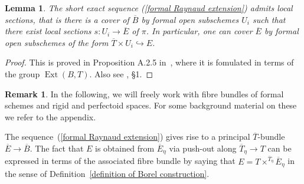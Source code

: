 \documentclass[10pt,oneside]{amsart}
\newtheorem{lemma}[theorem]{Lemma}
\theoremstyle{definition}
\newtheorem{remark}[theorem]{Remark}
\begin{document}
	\begin{lemma}\label{formal Raynaud sequence is locally split}
		The short exact sequence (\ref{formal Raynaud extension}) admits local sections, that is there is a cover of $\overline{B}$ by formal open subschemes $U_i$ such that there exist local sections $s:U_i\rightarrow \overline{E}$ of $\pi$. In particular, one can cover $\overline{E}$ by formal open subschemes of the form $\overline{T}\times U_i\hookrightarrow E$.
	\end{lemma}
	\begin{proof}
		This is proved in Proposition A.2.5 in~\cite{Lut}, where it is fomulated in terms of the group $\operatorname{Ext}(B,T)$. Also see \cite{BL}, \S 1.
	\end{proof}
	
	\begin{remark}
	In the following, we will freely work with fibre bundles of formal schemes and rigid and perfectoid spaces. For some background material on these we refer to the appendix.
	\end{remark}
	
	The sequence~(\ref{formal Raynaud extension}) gives rise to a principal $\overline{T}$-bundle
	$\overline{E}\rightarrow \overline{B}$. The fact that $E$ is obtained from $\overline{E}_\eta$ via push-out along $\overline{T}_\eta\rightarrow T$ can be expressed in terms of the associated fibre bundle by saying that $E = T\times^{\overline{T}_\eta}\overline{E}_\eta$ in the sense of Definition~\ref{definition of Borel construction}.
	
\end{document}
